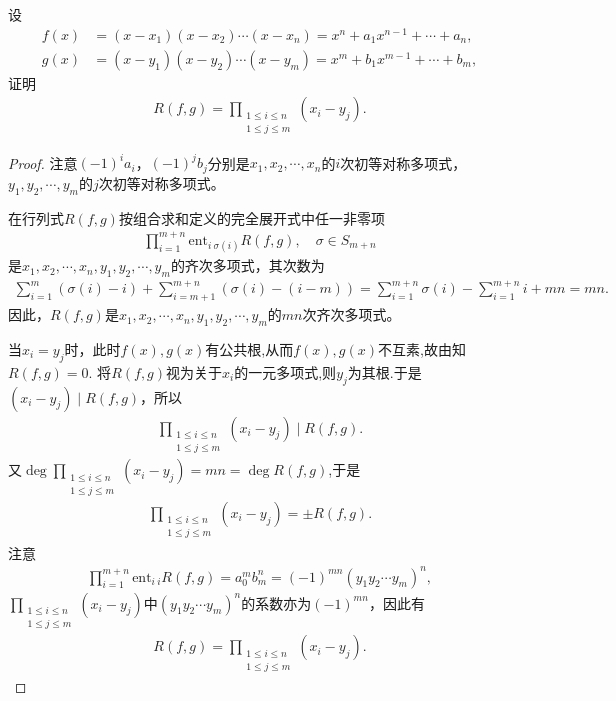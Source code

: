 \documentclass[../../main.tex]{subfiles}%
\begin{document}
\begin{proposition}\label{proposition:两个多项式的结式与根的关系}
设
\begin{align*}
f(x)&=(x-x_1)(x-x_2)\cdots(x-x_n)=x^n+a_1x^{n-1}+\cdots+a_n, \\
g(x)&=(x-y_1)(x-y_2)\cdots(x-y_m)=x^m+b_1x^{m-1}+\cdots+b_m,
\end{align*}
证明
\begin{align*}
R(f,g)=\prod\limits_{\substack{1\leqslant i\leqslant n \\ 1\leqslant j\leqslant m}}(x_i-y_j).
\end{align*}
\end{proposition}
\begin{proof}

注意$(-1)^ia_i$，$(-1)^jb_j$分别是$x_1,x_2,\cdots,x_n$的$i$次初等对称多项式，$y_1,y_2,\cdots,y_m$的$j$次初等对称多项式。

在行列式$R(f,g)$按组合求和定义的完全展开式中任一非零项
\begin{align*}
\prod\limits_{i=1}^{m+n}\mathrm{ent}_{i\ \sigma(i)}R(f,g),\quad \sigma\in S_{m+n}
\end{align*}
是$x_1,x_2,\cdots,x_n,y_1,y_2,\cdots,y_m$的齐次多项式，其次数为
\begin{align*}
\sum\limits_{i=1}^m(\sigma(i)-i)+\sum\limits_{i=m+1}^{m+n}(\sigma(i)-(i-m))=\sum\limits_{i=1}^{m+n}\sigma(i)-\sum\limits_{i=1}^{m+n}i+mn =mn.
\end{align*}
因此，$R(f,g)$是$x_1,x_2,\cdots,x_n,y_1,y_2,\cdots,y_m$的$mn$次齐次多项式。

当$x_i=y_j$时，此时$f(x),g(x)$有公共根,从而$f(x),g(x)$不互素,故由知$R(f,g)=0$.
将$R(f,g)$视为关于$x_i$的一元多项式,则$y_j$为其根.于是$(x_i-y_j)\mid R(f,g)$，所以
\begin{align*}
\prod\limits_{\substack{1\leqslant i\leqslant n \\ 1\leqslant j\leqslant m}}(x_i-y_j)\mid R(f,g).
\end{align*}
又$\deg\prod\limits_{\substack{1\leqslant i\leqslant n \\ 1\leqslant j\leqslant m}}(x_i-y_j)=mn=\deg R(f,g)$,于是
\begin{align*}
\prod\limits_{\substack{1\leqslant i\leqslant n \\ 1\leqslant j\leqslant m}}(x_i-y_j)=\pm R(f,g).
\end{align*}
注意
\begin{align*}
\prod\limits_{i=1}^{m+n}\mathrm{ent}_{i\ i}R(f,g)=a_0^mb_m^n=(-1)^{mn}(y_1y_2\cdots y_m)^n,
\end{align*}
$\prod\limits_{\substack{1\leqslant i\leqslant n \\ 1\leqslant j\leqslant m}}(x_i-y_j)$中$(y_1y_2\cdots y_m)^n$的系数亦为$(-1)^{mn}$，因此有
\begin{align*}
R(f,g)=\prod\limits_{\substack{1\leqslant i\leqslant n \\ 1\leqslant j\leqslant m}}(x_i-y_j).
\end{align*}

\end{proof}
\end{document}
